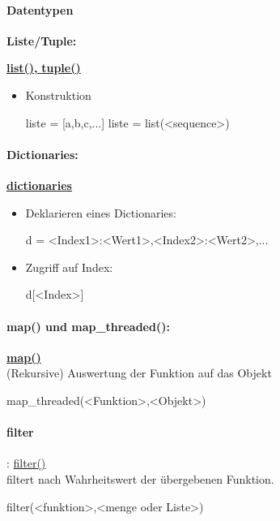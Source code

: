 \documentclass[a4paper,9pt,DIV15,twocolumn]{scrartcl}
\begin{document}
\paragraph{Datentypen}
\textbf{Liste/Tuple:} 	{\href{http://docs.python.org/library/functions.html#list}{\textbf{list(),} } \href{http://docs.python.org/library/functions.html#tuple}{\textbf{tuple()}}
\begin{itemize}
 \item Konstruktion
\begin{sagein}
liste = [a,b,c,...] 
liste = list(<sequence>)
\end{sagein}
\end{itemize}
\paragraph{Dictionaries:}		\href{http://docs.python.org/library/stdtypes.html?highlight=.update#mapping-types-dict}{\textbf{dictionaries}}
\begin{itemize}
 \item Deklarieren eines Dictionaries:
\begin{sagein}
d = {<Index1>:<Wert1>,<Index2>:<Wert2>,...}
\end{sagein}
 \item Zugriff auf Index:
\begin{sagein}
d[<Index>]
\end{sagein}
\end{itemize}

\paragraph{map() und map\_threaded():} \href{https://sage.math.uni-goettingen.de/doc/static/reference/sage/combinat/generator.html?highlight=map#sage.combinat.generator.map}{\textbf{map()}\\}
(Rekursive) Auswertung der Funktion auf das Objekt
\begin{sagein}
 map_threaded(<Funktion>,<Objekt>)
\end{sagein}

\paragraph{filter}: \href{https://sage.math.uni-goettingen.de/doc/static/reference/sage/combinat/combinat.html?highlight=filter#sage.combinat.combinat.CombinatorialClass.filter}{filter()}\\ filtert nach Wahrheitswert der übergebenen Funktion. 
\begin{sagein}
filter(<funktion>,<menge oder Liste>)
\end{sagein}

}
\end{document}
